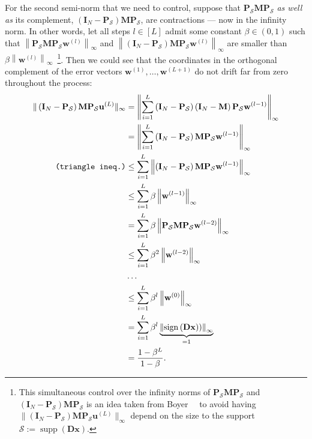 For the second semi-norm that we need to control, suppose that $\mathbf{P}_\mathcal{S} \mathbf{M} \mathbf{P}_\mathcal{S}$ \emph{as well as} its complement, $\left(\mathbf{I}_N - \mathbf{P}_\mathcal{S}\right) \mathbf{M} \mathbf{P}_\mathcal{S}$, are contractions --- now in the infinity norm. In other words, let all steps $l \in [L]$ admit some constant $\beta \in (0,1)$ such that $\left \| \mathbf{P}_\mathcal{S} \mathbf{M} \mathbf{P}_\mathcal{S} \mathbf{w}^{(l)} \right \|_{\infty}$ and $\left \| \left(\mathbf{I}_N - \mathbf{P}_\mathcal{S}\right) \mathbf{M} \mathbf{P}_\mathcal{S} \mathbf{w}^{(l)} \right \|_{\infty}$ are smaller than $\beta \left \| \mathbf{w}^{(l)} \right \|_{\infty}$~\footnote{This simultaneous control over the infinity norms of $\mathbf{P}_\mathcal{S} \mathbf{M} \mathbf{P}_\mathcal{S}$ and $\left(\mathbf{I}_N - \mathbf{P}_\mathcal{S}\right) \mathbf{M} \mathbf{P}_\mathcal{S}$ is an idea taken from Boyer~\etal~\cite{boyer2019} to avoid having $\| \left(\mathbf{I}_N - \mathbf{P}_\mathcal{S}\right) \mathbf{M} \mathbf{P}_\mathcal{S} \mathbf{u}^{(L)} \|_\infty$ depend on the size to the support $\mathcal{S} := \operatorname{supp}\left ( \mathbf{Dx} \right )$.}. Then we could see that the coordinates in the orthogonal complement of the error vectors $\mathbf{w}^{(1)}, \dots, \mathbf{w}^{(L+1)}$ do not drift far from zero throughout the process:
\begingroup
\allowdisplaybreaks
\begin{align}
    \| \left(\mathbf{I}_N - \mathbf{P}_\mathcal{S}\right) \mathbf{M} \mathbf{P}_\mathcal{S} \mathbf{u}^{(L)} \|_\infty & = \left \| \sum_{i=1}^{L} \left(\mathbf{I}_N - \mathbf{P}_\mathcal{S}\right) \left(\mathbf{I}_N - \mathbf{M}\right) \mathbf{P}_{\mathcal{S}} \mathbf{w}^{(l-1)} \right \|_{\infty} \nonumber \\
    & = \left \| \sum_{i=1}^{L} \left(\mathbf{I}_N - \mathbf{P}_\mathcal{S}\right) \mathbf{M} \mathbf{P}_{\mathcal{S}} \mathbf{w}^{(l-1)} \right \|_{\infty} \nonumber \\
    \texttt{(triangle ineq.)} & \leq \sum_{i=1}^{L} \left \| \left(\mathbf{I}_N - \mathbf{P}_\mathcal{S}\right) \mathbf{M} \mathbf{P}_{\mathcal{S}} \mathbf{w}^{(l-1)} \right \|_{\infty} \nonumber \\
    & \leq \sum_{i=1}^{L} \beta \left \| \mathbf{w}^{(l-1)} \right \|_{\infty} \nonumber \\
    & = \sum_{i=1}^{L} \beta \left \| \mathbf{P}_\mathcal{S} \mathbf{M} \mathbf{P}_\mathcal{S} \mathbf{w}^{(l-2)} \right \|_{\infty} \nonumber \\
    & \leq \sum_{i=1}^{L} \beta^2 \left \| \mathbf{w}^{(l-2)} \right \|_{\infty} \nonumber \\
    & \dots \nonumber \\
    & \leq \sum_{i=1}^{L} \beta^l \left \| \mathbf{w}^{(0)} \right \|_{\infty} \nonumber \\
    & = \sum_{i=1}^{L} \beta^l \underbrace{\left \| \operatorname{sign} \left ( \mathbf{Dx} \right ) ) \right \|_{\infty}}_{=1} \nonumber \\
    & = \frac{1 - \beta^L}{1 - \beta}\label{eq:golf_bound_off_support}.
\end{align}
